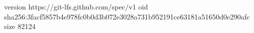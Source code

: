 version https://git-lfs.github.com/spec/v1
oid sha256:3facf5857b4e978fc0b0d3b072e3028a731b952191ce63181a51650d0e290afc
size 82124
